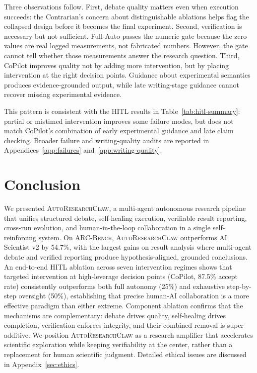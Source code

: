 \documentclass{llmxive}
\providecommand{\system}{\textsc{AutoResearchClaw}}
\providecommand{\bench}{\textsc{ARC-Bench}}
\begin{document}
Three observations follow. First, debate quality matters even when execution succeeds: the Contrarian's concern about distinguishable ablations helps flag the collapsed design before it becomes the final experiment. Second, verification is necessary but not sufficient. Full-Auto passes the numeric gate because the zero values are real logged measurements, not fabricated numbers. However, the gate cannot tell whether those measurements answer the research question. Third, CoPilot improves quality not by adding more intervention, but by placing intervention at the right decision points. Guidance about experimental semantics produces evidence-grounded output, while late writing-stage guidance cannot recover missing experimental evidence.

This pattern is consistent with the HITL results in Table~\ref{tab:hitl-summary}: partial or mistimed intervention improves some failure modes, but does not match CoPilot's combination of early experimental guidance and late claim checking. Broader failure and writing-quality audits are reported in Appendices~\ref{app:failures} and~\ref{app:writing-quality}.

\vspace{-0.5em}
\section{Conclusion}
\label{sec:conclusion}
\vspace{-0.5em}

We presented \system{}, a multi-agent autonomous research pipeline that unifies structured debate, self-healing execution, verifiable result reporting, cross-run evolution, and human-in-the-loop collaboration in a single self-reinforcing system. On \bench, \system{} outperforms AI Scientist v2 by 54.7\%, with the largest gains on result analysis where multi-agent debate and verified reporting produce hypothesis-aligned, grounded conclusions. An end-to-end HITL ablation across seven intervention regimes shows that targeted intervention at high-leverage decision points (CoPilot, 87.5\% accept rate) consistently outperforms both full autonomy (25\%) and exhaustive step-by-step oversight (50\%), establishing that precise human-AI collaboration is a more effective paradigm than either extreme. Component ablation confirms that the mechanisms are complementary: debate drives quality, self-healing drives completion, verification enforces integrity, and their combined removal is super-additive. We position \system{} as a research amplifier that accelerates scientific exploration while keeping verifiability at the center, rather than a replacement for human scientific judgment. Detailed ethical issues are discussed in Appendix~\ref{sec:ethics}.
\end{document}
